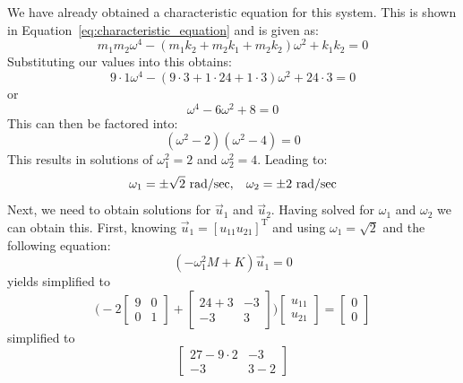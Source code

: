 \documentclass[12pt,letter]{article}
\begin{document}
\begin{example}
	We have already obtained a characteristic equation for this system. This is shown in Equation~\ref{eq:characteristic_equation} and is given as:
	\begin{equation}
	m_1 m_2 \omega^4 - (m_1 k_2 + m_2 k_1 + m_2 k_2)\omega^2 + k_1 k_2 = 0
	\end{equation}
	Substituting our values into this obtains:
	\begin{equation}
	9 \cdot 1 \omega^4 - (9 \cdot 3 + 1 \cdot 24 + 1 \cdot 3)\omega^2 + 24 \cdot 3 = 0
	\end{equation}
	or
	\begin{equation}
	\omega^4 - 6\omega^2 + 8 =0
	\end{equation}
	This can then be factored into:
	\begin{equation}
	(\omega^2-2)(\omega^2-4)=0
	\end{equation}
	This results in solutions of $\omega^2_1 = 2$ and $\omega^2_2 = 4$. Leading to:
	\begin{equation}
	\omega_1 = \pm \sqrt{2} \text{ rad/sec}, \hspace{2ex} \omega_2 = \pm 2 \text{ rad/sec}
	\end{equation}
	Next, we need to obtain solutions for $\vec{u}_1$ and $\vec{u}_2$. Having solved for $\omega_1$ and $\omega_2$ we can obtain this. First, knowing $\vec{u}_1 = [u_{11} u_{21}]^\text{T}$ and using $\omega_1 = \sqrt{2}$ and the following equation:
	\begin{equation}
		(-\omega_1^2 M  + K)\vec{u}_1 =0
	\end{equation}
	yields
	simplified to
	\begin{equation}
		 \bigg(-2\begin{bmatrix} 9 & 0 \\   0  & 1 \end{bmatrix} + \begin{bmatrix} 24+3 & -3 \\    -3  & 3 \end{bmatrix}\bigg)\begin{bmatrix} u_{11}\\ u_{21}\end{bmatrix} = \begin{bmatrix} 0\\ 0\end{bmatrix}
	\end{equation}
	simplified to
	\begin{equation}
		 \begin{bmatrix} 27-9\cdot 2 & -3 \\    -3  & 3-2 \end{bmatrix} 

\end{equation}
\end{example}
\end{document}
